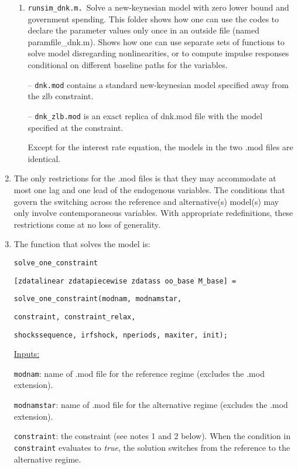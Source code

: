 \documentclass[12pt]{article}
\begin{document}
\begin{enumerate}
\begin{enumerate}
\item \texttt{runsim\_dnk.m. }Solve a new-keynesian model with zero lower bound and
government spending. This folder shows how one can use the codes to declare
the parameter values only once in an outside file (named paramfile\_dnk.m).
Shows how one can use separate sets of functions to solve model disregarding
nonlinearities, or to compute impulse responses conditional on different
baseline paths for the variables.

-- \texttt{dnk.mod} contains a standard new-keynesian model specified away
from the zlb constraint.

-- \texttt{dnk\_zlb.mod} is an exact replica of dnk.mod file with the model
specified at the constraint.

Except for the interest rate equation, the models in the two .mod files are
identical.

\end{enumerate}

\item The only restrictions for the .mod files is that they may accommodate at most
one lag and one lead of the endogenous variables. The conditions that govern the switching
across the reference and alternative(s) model(s) may
only involve contemporaneous variables. With appropriate redefinitions, these
restrictions come at no loss of generality.


\item The function that solves the model is:

\texttt{solve\_one\_constraint}

\texttt{[zdatalinear zdatapiecewise zdatass oo\_base M\_base] = }

\texttt{solve\_one\_constraint(modnam, modnamstar, }

\texttt{constraint, constraint\_relax, }

\texttt{shockssequence, irfshock, nperiods, maxiter, init);}

\medskip

\underline{Inputs:}

\texttt{modnam}: name of .mod file for the reference regime (excludes the .mod extension).

\texttt{modnamstar}: name of .mod file for the alternative regime (excludes the .mod extension).

\texttt{constraint}: the constraint (see notes 1 and 2 below). When the condition in \texttt{constraint} evaluates to \emph{true}, the solution switches from the reference to the alternative regime.


\end{enumerate}
\end{document}
